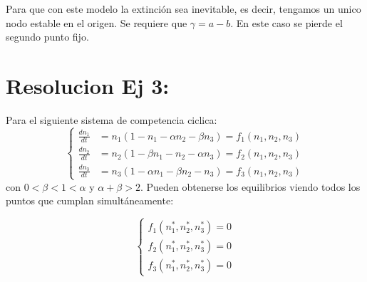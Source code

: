 \documentclass[twocolumn,aps,prl]{revtex4-1}
\newcommand{\nstar}{n^*}
\begin{document}


Para que con este modelo la extinción sea inevitable, es decir, tengamos un unico nodo estable en el origen. Se requiere que $\gamma = a-b$. En este caso se pierde el segundo punto fijo.

% 
%                                 
% 

\section{Resolucion Ej 3:}

Para el siguiente sistema de competencia ciclica:
$$
\left\{
\begin{aligned}
\frac{d n_{1}}{d t}&=n_{1}\left(1-n_{1}-\alpha n_{2}-\beta n_{3}\right) = f_1(n_1,n_2,n_3)\\
\frac{d n_{2}}{d t}&=n_{2}\left(1-\beta n_{1}-n_{2}-\alpha n_{3}\right) = f_2(n_1,n_2,n_3) \\
\frac{d n_{3}}{d t}&=n_{3}\left(1-\alpha n_{1}-\beta n_{2}-n_{3}\right) = f_3(n_1,n_2,n_3)
\end{aligned}
\right.
$$
con $0<\beta<1<\alpha$ y $\alpha+\beta>2$. Pueden obtenerse los  equilibrios viendo todos los puntos que cumplan simultáneamente: 

$$\left\lbrace
\begin{aligned}
    f_1(\nstar_1,\nstar_2,\nstar_3) = 0\\ 
    f_2(\nstar_1,\nstar_2,\nstar_3) = 0\\ 
    f_3(\nstar_1,\nstar_2,\nstar_3) = 0   
\end{aligned}\right.
$$
\end{document}
